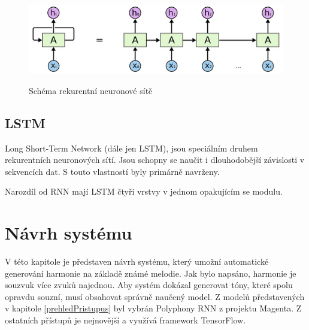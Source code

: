 \begin{figure}[h]\centering
    \centering
    \includegraphics[width=0.6\linewidth]{obrazky/RNNSchema.png}\\[1pt]  
    \caption{Schéma rekurentní neuronové sítě\cite{colah_lstm}}    
    \label{obrazekSchemaRekurentniNeuronoveSite}
\end{figure}

\section{LSTM}
\label{lstmTeorie}
Long Short-Term Network (dále jen LSTM), 
jsou speciálním druhem rekurentních neuronových sítí.
Jsou schopny se naučit i dlouhodobější závislosti v sekvencích dat.
S touto vlastností byly primárně navrženy.\cite{colah_lstm}
\par

Narozdíl od RNN mají LSTM čtyři vrstvy v jednom opakujícím se modulu.


\chapter{Návrh systému}
V této kapitole je představen návrh systému,
který umožní automatické generování harmonie na základě známé melodie.
Jak bylo napsáno, harmonie je souzvuk více zvuků najednou.
Aby systém dokázal generovat tóny, které spolu opravdu souzní,
musí obsahovat správně naučený model.
Z modelů představených v kapitole \ref{prehledPristupus} byl vybrán 
Polyphony RNN z projektu Magenta.
Z ostatních přístupů je nejnovější a využívá framework TensorFlow\cite{YinCheng_comparativeStudy,google_git_polyphony}.

